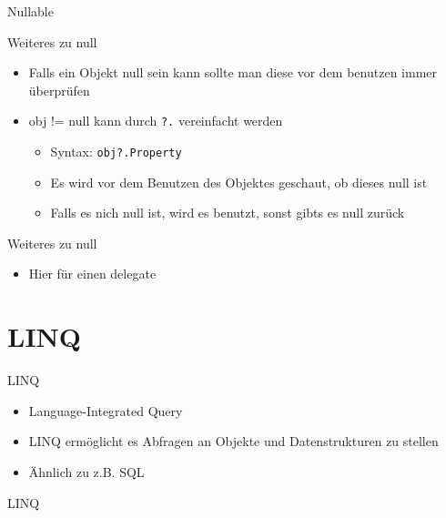 \begin{frame}{Nullable}
		
\end{frame}

\begin{frame}{Weiteres zu null}
	\begin{itemize}
		\item Falls ein Objekt \alert{null} sein kann sollte man diese vor dem benutzen immer überprüfen
		\item \alert{obj != null} kann durch \texttt{\alert{?.}} vereinfacht werden	
		\begin{itemize}
			\item Syntax: \texttt{obj\alert{?.}Property}
			\item Es wird vor dem Benutzen des Objektes geschaut, ob dieses \alert{null} ist
			\item Falls es nich \alert{null} ist, wird es benutzt, sonst gibts es \alert{null} zurück
		\end{itemize}
	\end{itemize}
\end{frame}

\begin{frame}{Weiteres zu null}
	
	\begin{itemize}
		\item Hier für einen \alert{delegate}
	\end{itemize}		
		
\end{frame}

\section{LINQ}
\begin{frame}{LINQ}
	\begin{itemize}
		\item Language-Integrated Query
		\item LINQ ermöglicht es Abfragen an Objekte und Datenstrukturen zu stellen
		\item Ähnlich zu z.B. SQL
	\end{itemize}
\end{frame}

\begin{frame}{LINQ}
		
\end{frame}



